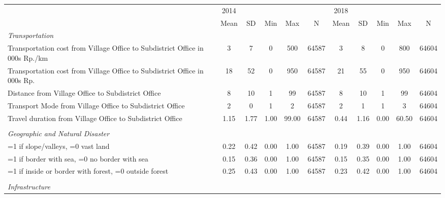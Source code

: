 \begin{tabular}{l*{2}{ccccc}}
\toprule
                &     2014&         &         &         &         &     2018&         &         &         &         \\
                &     Mean&       SD&      Min&      Max&        N&     Mean&       SD&      Min&      Max&        N\\
\midrule
\emph{Transportation}&         &         &         &         &         &         &         &         &         &         \\
Transportation cost from Village Office to Subdistrict Office in 000s Rp./km&        3&        7&        0&      500&    64587&        3&        8&        0&      800&    64604\\
Transportation cost from Village Office to Subdistrict Office in 000s Rp.&       18&       52&        0&      950&    64587&       21&       55&        0&      950&    64604\\
Distance from Village Office to Subdistrict Office&        8&       10&        1&       99&    64587&        8&       10&        1&       99&    64604\\
Transport Mode from Village Office to Subdistrict Office&        2&        0&        1&        2&    64587&        2&        1&        1&        3&    64604\\
Travel duration from Village Office to Subdistrict Office&     1.15&     1.77&     1.00&    99.00&    64587&     0.44&     1.16&     0.00&    60.50&    64604\\
\vspace{0.1em} \\ \emph{Geographic and Natural Disaster}&         &         &         &         &         &         &         &         &         &         \\
=1 if slope/valleys, =0 vast land&     0.22&     0.42&     0.00&     1.00&    64587&     0.19&     0.39&     0.00&     1.00&    64604\\
=1 if border with sea, =0 no border with sea&     0.15&     0.36&     0.00&     1.00&    64587&     0.15&     0.35&     0.00&     1.00&    64604\\
=1 if inside or border with forest, =0 outside forest&     0.25&     0.43&     0.00&     1.00&    64587&     0.23&     0.42&     0.00&     1.00&    64604\\
\vspace{0.1em} \\ \emph{Infrastructure}&         &         &         &         &         &         &         &         &         &         \\

\end{tabular}
